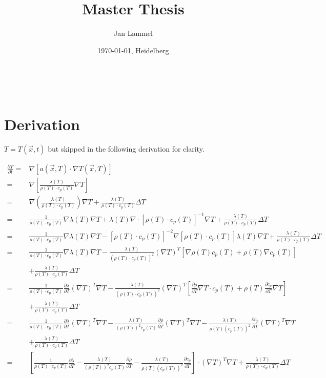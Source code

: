 \documentclass{scrartcl}[12pt, halfparskip]
\title{Master Thesis}
\author{Jan Lammel}
\date{\today{}, Heidelberg}
\begin{document}
\maketitle \ \\ 
\newpage

\section{Derivation}

$T = T(\vec{x},t)$ but skipped in the following derivation for clarity.

\begin{align*}
	\frac{\partial T}{\partial t} = & \nabla \left[ a(\vec{x},T) \cdot \nabla T(\vec{x},T) \right] \\
	= & \nabla \left[ \frac{\lambda(T)}{\rho(T) \cdot c_p(T)} \nabla T \right] \\
	= & \nabla \left( \frac{\lambda(T)}{\rho(T) \cdot c_p(T)} \right) \nabla T + \frac{\lambda(T)}{\rho(T) \cdot c_p(T)} \Delta T \\
	= & \frac{1}{\rho (T) \cdot c_p (T)} \nabla \lambda (T) \nabla T + \lambda (T) \nabla \cdot \left[ \rho (T) \cdot c_p (T) \right]^{-1} \nabla T + \frac{\lambda (T)}{\rho (T) \cdot c_p (T)} \Delta T \\
	= & \frac{1}{\rho (T) \cdot c_p (T)} \nabla \lambda (T) \nabla T - \left[ \rho (T) \cdot c_p (T) \right]^{-2} \nabla \left[ \rho (T) \cdot c_p (T) \right] \lambda(T) \nabla T + \frac{\lambda (T)}{\rho (T) \cdot c_p (T)} \Delta T \\
	= & \frac{1}{\rho (T) \cdot c_p (T)} \nabla \lambda (T) \nabla T - \frac{\lambda (T)}{(\rho(T) \cdot c_p(T))^2} (\nabla T)^T \left[ \nabla \rho(T) c_p(T) + \rho(T) \nabla c_p(T) \right] \\
	& + \frac{\lambda (T)}{\rho (T) \cdot c_p (T)} \Delta T \\
	= & \frac{1}{\rho (T) \cdot c_p (T)} \frac{\partial \lambda}{\partial T} (\nabla T)^T \nabla T - \frac{\lambda (T)}{(\rho(T) \cdot c_p(T))^2} (\nabla T)^T \left[ \frac{\partial \rho}{\partial T} \nabla T \cdot c_p(T) + \rho(T) \frac{ \partial c_p}{\partial T} \nabla T \right] \\
	& + \frac{\lambda (T)}{\rho (T) \cdot c_p (T)} \Delta T \\
	= & \frac{1}{\rho (T) \cdot c_p (T)} \frac{\partial \lambda}{\partial T} (\nabla T)^T \nabla T - \frac{\lambda (T)}{(\rho(T))^2 c_p(T)} \frac{\partial \rho}{\partial T} (\nabla T)^T \nabla T - \frac{\lambda (T)}{\rho(T) (c_p(T))^2} \frac{\partial c_p}{\partial T} (\nabla T)^T \nabla T \\
	& + \frac{\lambda (T)}{\rho (T) \cdot c_p (T)} \Delta T \\
	= & \left[ \frac{1}{\rho (T) \cdot c_p (T)} \frac{\partial \lambda}{\partial T} - \frac{\lambda (T)}{(\rho(T))^2 c_p(T)} \frac{\partial \rho}{\partial T} - \frac{\lambda (T)}{\rho(T) (c_p(T))^2} \frac{\partial c_p}{\partial T} \right] \cdot (\nabla T)^T \nabla T + \frac{\lambda (T)}{\rho (T) \cdot c_p (T)} \Delta T \\
\end{align*}
\end{document}
